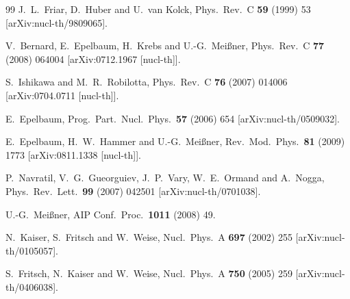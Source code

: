 \documentclass[a4paper,fleqn]{scrartcl}
\begin{document}
{\begin{thebibliography}{99}
  J.~L.~Friar, D.~Huber and U.~van Kolck,
  Phys.\ Rev.\  C {\bf 59} (1999) 53
  [arXiv:nucl-th/9809065].

  V.~Bernard, E.~Epelbaum, H.~Krebs and U.-G.~Mei\ss ner,
  Phys.\ Rev.\  C {\bf 77} (2008) 064004
  [arXiv:0712.1967 [nucl-th]].

  S.~Ishikawa and M.~R.~Robilotta,
  Phys.\ Rev.\  C {\bf 76} (2007) 014006
  [arXiv:0704.0711 [nucl-th]].

  E.~Epelbaum,
  Prog.\ Part.\ Nucl.\ Phys.\  {\bf 57} (2006) 654
  [arXiv:nucl-th/0509032].

  E.~Epelbaum, H.~W.~Hammer and U.-G.~Mei\ss ner,
  Rev.\ Mod.\ Phys.\  {\bf 81} (2009) 1773
  [arXiv:0811.1338 [nucl-th]].

  P.~Navratil, V.~G.~Gueorguiev, J.~P.~Vary, W.~E.~Ormand and A.~Nogga,
  Phys.\ Rev.\ Lett.\  {\bf 99} (2007) 042501
  [arXiv:nucl-th/0701038].

  U.-G.~Mei\ss ner,
  AIP Conf.\ Proc.\  {\bf 1011} (2008) 49.

  N.~Kaiser, S.~Fritsch and W.~Weise,
  Nucl.\ Phys.\  A {\bf 697} (2002) 255
  [arXiv:nucl-th/0105057].

  S.~Fritsch, N.~Kaiser and W.~Weise,
  Nucl.\ Phys.\  A {\bf 750} (2005) 259
  [arXiv:nucl-th/0406038].


\end{thebibliography}}
\end{document}
